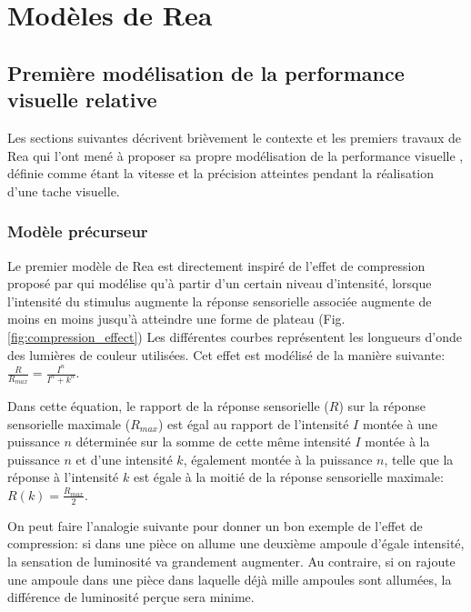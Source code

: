\chapter{Modèles de Rea}
	\section{Première modélisation de la performance visuelle relative}
	\par Les sections suivantes décrivent brièvement le contexte et les premiers travaux de Rea qui l'ont mené à proposer sa propre modélisation de la performance visuelle \citep{rea_toward_1986, rea_toward_1987}, définie comme étant la vitesse et la précision atteintes pendant la réalisation d'une tache visuelle.
	
	\subsection{Modèle précurseur}	
	\par Le premier modèle de Rea est directement inspiré de l'effet de compression proposé par  \citep{naka_attempt_1966} qui modélise qu'à partir d'un certain niveau d'intensité, lorsque l'intensité du stimulus augmente la réponse sensorielle associée augmente de moins en moins jusqu'à atteindre une forme de plateau (Fig. \ref{fig:compression_effect}) Les différentes courbes représentent les longueurs d'onde des lumières de couleur utilisées. Cet effet est modélisé de la manière suivante: $\frac{R}{R_{max}} = \frac{I^n}{I^n + k^n}$.
	
	\par Dans cette équation, le rapport de la réponse sensorielle ($R$) sur la réponse sensorielle maximale ($R_{max}$) est égal au rapport de l'intensité $I$ montée à une puissance $n$ déterminée sur la somme de cette même intensité $I$ montée à la puissance $n$ et d'une intensité $k$, également montée à la puissance $n$, telle que la réponse à l'intensité $k$ est égale à la moitié de la réponse sensorielle maximale: $R(k) = \frac{R_{max}}{2}$.
	
	\par On peut faire l'analogie suivante pour donner un bon exemple de l'effet de compression: si dans une pièce on allume une deuxième ampoule d'égale intensité, la sensation de luminosité va grandement augmenter. Au contraire, si on rajoute une ampoule dans une pièce dans laquelle déjà mille ampoules sont allumées, la différence de luminosité perçue sera minime.	
	
